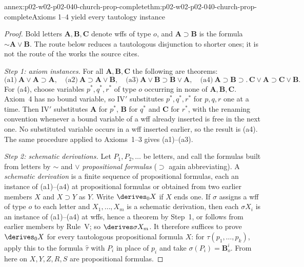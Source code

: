\begin{annexitem}{annex:p02-w02-p02-040-church-prop-complete}{thm:p02-w02-p02-040-church-prop-complete}{Axioms 1--4 yield every tautology instance}
\begin{proof}
Bold letters \(\mathbf A,\mathbf B,\mathbf C\) denote wffs of type \(o\), and
\(\mathbf A\supset\mathbf B\) is the formula \(\sim\mathbf A\vee\mathbf B\).
The route below reduces a tautologous disjunction to shorter ones; it is
not the route of the works the source cites.

\emph{Step 1: axiom instances.}  For all \(\mathbf A,\mathbf B,\mathbf C\) the
following are theorems:
\[
 \text{(a1)}\ \mathbf A\vee\mathbf A\supset\mathbf A,\quad
 \text{(a2)}\ \mathbf A\supset\mathbf A\vee\mathbf B,\quad
 \text{(a3)}\ \mathbf A\vee\mathbf B\supset\mathbf B\vee\mathbf A,\quad
 \text{(a4)}\ \mathbf A\supset\mathbf B\supset.\,\mathbf C\vee\mathbf A\supset\mathbf C\vee\mathbf B.
\]
For (a4), choose variables \(p^*,q^*,r^*\) of type \(o\) occurring in none of
\(\mathbf A,\mathbf B,\mathbf C\).  Axiom~4 has no bound variable, so IV\('\)
substitutes \(p^*,q^*,r^*\) for \(p,q,r\) one at a time.  Then IV\('\)
substitutes \(\mathbf A\) for \(p^*\), \(\mathbf B\) for \(q^*\) and
\(\mathbf C\) for \(r^*\), with the renaming convention whenever a bound
variable of a wff already inserted is free in the next one.  No substituted
variable occurs in a wff inserted earlier, so the result is (a4).  The same
procedure applied to Axioms~1--3 gives (a1)--(a3).

\emph{Step 2: schematic derivations.}  Let \(P_1,P_2,\ldots\) be letters, and
call the formulas built from letters by \(\sim\) and \(\vee\)
\emph{propositional formulas} (\(\supset\) again abbreviating).  A
\emph{schematic derivation} is a finite sequence of propositional formulas,
each an instance of (a1)--(a4) at propositional formulas or obtained from
two earlier members \(X\) and \(X\supset Y\) as \(Y\).  Write \(\derives_0X\)
if \(X\) ends one.  If \(\sigma\) assigns a wff of type \(o\) to each letter
and \(X_1,\ldots,X_m\) is a schematic derivation, then each \(\sigma X_i\) is
an instance of (a1)--(a4) at wffs, hence a theorem by Step~1, or follows from
earlier members by Rule~V; so \(\derives\sigma X_m\).  It therefore suffices to
prove \(\derives_0X\) for every tautologous propositional formula \(X\): for
\(\tau(p_1,\ldots,p_k)\), apply this to the formula \(\hat\tau\) with \(P_i\)
in place of \(p_i\) and take \(\sigma(P_i)=\mathbf B^i_o\).  From here on
\(X,Y,Z,R,S\) are propositional formulas.


\end{proof}
\end{annexitem}
